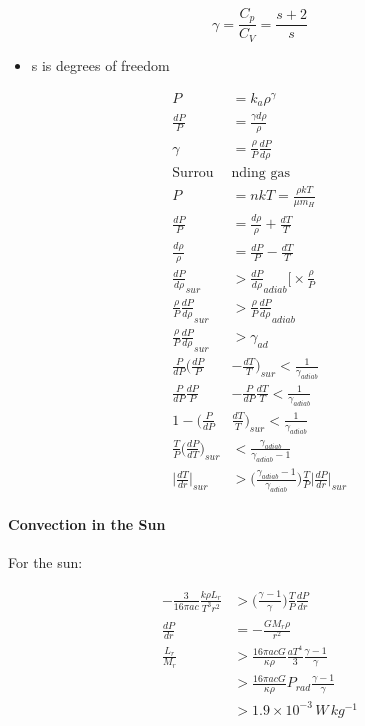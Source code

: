 \documentclass[a4paper,11pt,normalem]{article}
\begin{document}
\[
    \gamma = \frac{C_p}{C_V} = \frac{s + 2}{s}
\]

\begin{itemize}
\item
  s is degrees of freedom
\end{itemize}

\[
    \begin{aligned}
    P &= k_a \rho^\gamma \\
    \frac{dP}{P} &= \frac{\gamma d\rho}{\rho} \\
    \gamma &= \frac{\rho}{P}\frac{dP}{d\rho} \\
    \text{Surrou}&\text{nding gas} \\
    P &= nkT = \frac{\rho kT}{\mu m_H} \\
    \frac{dP}{P} &= \frac{d\rho}{\rho} + \frac{dT}{T} \\
    \frac{d\rho}{\rho} &= \frac{dP}{P} - \frac{dT}{T} \\
    \frac{dP}{d\rho}_{sur} &> \frac{dP}{d\rho}_{adiab} \Bigg[\times \frac{\rho}{P} \\
    \frac{\rho}{P}\frac{dP}{d\rho}_{sur} &> \frac{\rho}{P} \frac{dP}{d\rho}_{adiab} \\
    \frac{\rho}{P}\frac{dP}{d\rho}_{sur} &> \gamma_{ad} \\
    \frac{P}{dP}\Big(\frac{dP}{P} &- \frac{dT}{T}\Big)_{sur} < \frac{1}{\gamma_{adiab}} \\
    \frac{P}{dP}\frac{dP}{P} &- \frac{P}{dP}\frac{dT}{T} < \frac{1}{\gamma_{adiab}} \\
    1 - \Big(\frac{P}{dP}&\frac{dT}{T}\Big)_{sur} < \frac{1}{\gamma_{adiab}} \\
    \frac{T}{P} \Big(\frac{dP}{dT}\Big)_{sur} &< \frac{\gamma_{adiab}}{\gamma_{adiab} - 1} \\
    \Big|\frac{dT}{dr}\Big|_{sur} &> \Big(\frac{\gamma_{adiab} - 1}{\gamma_{adiab}}\Big)\frac{T}{P} \Big|\frac{dP}{dr}\Big|_{sur_{}}
    \end{aligned}
\]

\paragraph{Convection in the Sun}\label{convection-in-the-sun}

For the sun:

\[
    \begin{aligned}
    -\frac{3}{16\pi a c}\frac{k\rho L_r}{T^3 r^2} &>  \Big(\frac{\gamma_{} - 1}{\gamma_{}}\Big)\frac{T}{P} \frac{dP}{dr} \\
    \frac{dP}{dr} &= -\frac{GM_r \rho}{r^2} \\
    \frac{L_r}{M_r} &> \frac{16 \pi a c G}{\kappa\rho} \frac{aT^4}{3} \frac{\gamma - 1}{\gamma} \\
    &> \frac{16 \pi acG}{\kappa\rho}P_{rad}\frac{\gamma - 1}{\gamma} \\
    &> 1.9\times10^{-3}\,W\,kg^{-1}
    \end{aligned}
\]
\end{document}
